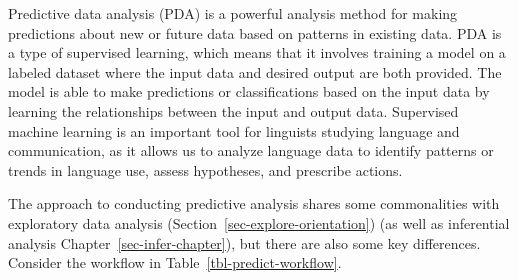 \documentclass[
  letterpaper,
  krantz1]{latex/krantz-mod}
\theoremstyle{definition}
\theoremstyle{definition}
\theoremstyle{remark}
\begin{document}
Predictive data analysis (PDA) is a powerful analysis method for making
predictions about new or future data based on patterns in existing data.
PDA is a type of supervised learning, which means that it involves
training a model on a labeled dataset where the input data and desired
output are both provided. The model is able to make predictions or
classifications based on the input data by learning the relationships
between the input and output data. Supervised machine learning is an
important tool for linguists studying language and communication, as it
allows us to analyze language data to identify patterns or trends in
language use, assess hypotheses, and prescribe actions.

The approach to conducting predictive analysis shares some commonalities
with exploratory data analysis (Section~\ref{sec-explore-orientation})
(as well as inferential analysis Chapter~\ref{sec-infer-chapter}), but
there are also some key differences. Consider the workflow in
Table~\ref{tbl-predict-workflow}.
\end{document}
